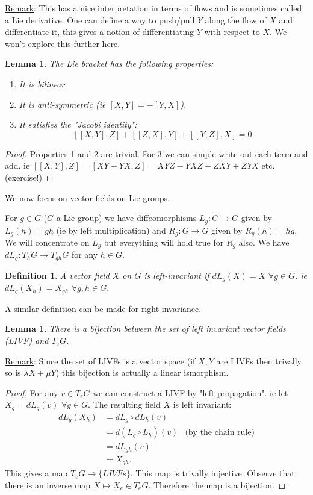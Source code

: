 \documentclass[12pt,a4paper]{article}
\newcommand{\ul}[1]{\underline{#1}}
\newtheorem{defn}[thm]{Definition}
\newtheorem{lemma}[thm]{Lemma}
\begin{document}
\ul{Remark}: This has a nice interpretation in terms of flows and is sometimes called a Lie derivative. One can define a way to push/pull $Y$ along the flow of $X$ and differentiate it, this gives a notion of differentiating $Y$ with respect to $X$. We won't explore this further here.

\begin{lemma}
The Lie bracket has the following properties:
\begin{enumerate}
\item It is bilinear.
\item It is anti-symmetric (ie $[X, Y] = - [Y, X]$).
\item It satisfies the "Jacobi identity":
\[ [[X, Y], Z] + [[Z, X], Y] + [[Y, Z], X] = 0. \]
\end{enumerate}
\end{lemma}

\begin{proof}
Properties 1 and 2 are trivial. For 3 we can simple write out each term and add. ie
$[[X, Y], Z] = [XY - YX, Z] = XYZ - YXZ - ZXY + ZYX$ etc. (exercise!)
\end{proof}

We now focus on vector fields on Lie groups.

For $g \in G$ ($G$ a Lie group) we have diffeomorphisms $L_g:G\to G$ given by $L_g(h) = gh$ (ie by left multiplication) and $R_g:G\to G$ given by $R_g(h) = hg$. We will concentrate on $L_g$ but everything will hold true for $R_g$ also. We have $dL_g : T_hG \to T_{gh}G$ for any $h \in G$.

\begin{defn}
A vector field $X$ on $G$ is left-invariant if $dL_g(X) = X \,\, \forall g \in G$. ie $dL_g(X_h) = X_{gh} \,\, \forall g, h \in G.$
\end{defn}
A similar definition can be made for right-invariance.

\begin{lemma}
There is a bijection between the set of left invariant vector fields (LIVF) and $T_eG$.
\end{lemma}

\ul{Remark}: Since the set of LIVFs is a vector space (if $X, Y$ are LIVFs then trivally so is $\lambda X + \mu Y$) this bijection is actually a linear ismorphism.

\begin{proof}
For any $v\in T_eG$ we can construct a LIVF by "left propagation". ie let $X_g = dL_g(v) \,\, \forall g\in G$. The resulting field $X$ is left invariant:
\begin{align*}
dL_g(X_h) &= dL_g \circ dL_h(v) & \\
&= d(L_g \circ L_h)(v) & \mbox{(by the chain rule)} \\
&= dL_{gh}(v) &\\
&= X_{gh}.
\end{align*}
This gives a map $T_eG \to \{LIVFs\}$. This map is trivally injective. Observe that there is an inverse map $X \mapsto X_e \in T_eG$. Therefore the map is a bijection.
\end{proof}
\end{document}
